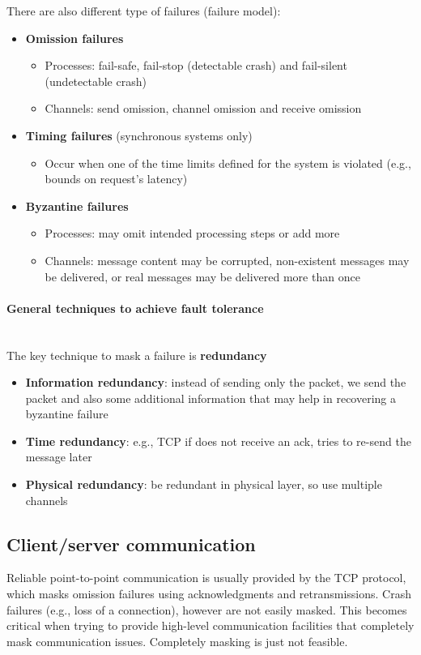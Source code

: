\documentclass[10pt,a4paper]{article}
\newcommand{\myparagraph}[1]{\paragraph{#1}\mbox{}\\[0.05in]}
\begin{document}
There are also different type of failures (failure model):
\begin{itemize}
	\item \textbf{Omission failures}
	\begin{itemize}
		\item Processes: fail-safe, fail-stop (detectable crash) and fail-silent (undetectable crash)
		\item Channels: send omission, channel omission and receive omission
	\end{itemize}
	\item \textbf{Timing failures} (synchronous systems only)
	\begin{itemize}
		\item Occur when one of the time limits defined for the system is violated (e.g., bounds on request's latency)
	\end{itemize}
	\item \textbf{Byzantine failures}
	\begin{itemize}
		\item Processes: may omit intended processing steps or add more
		\item Channels: message content may be corrupted, non-existent messages may be delivered, or real messages may be delivered more than once
	\end{itemize}
\end{itemize}
\myparagraph{General techniques to achieve fault tolerance}
The key technique to mask a failure is \textbf{redundancy}
\begin{itemize}
	\item \textbf{Information redundancy}: instead of sending only the packet, we send the packet and also some additional information that may help in recovering a byzantine failure
	\item \textbf{Time redundancy}: e.g., TCP if does not receive an ack, tries to re-send the message later
	\item \textbf{Physical redundancy}: be redundant in physical layer, so use multiple channels
\end{itemize}
\subsection{Client/server communication}
Reliable point-to-point communication is usually provided by the TCP protocol, which masks omission failures using acknowledgments and retransmissions. Crash failures (e.g., loss of a connection), however are not easily masked. This becomes critical when trying to provide high-level communication facilities that completely mask communication issues. Completely masking is just not feasible. 
\end{document}
